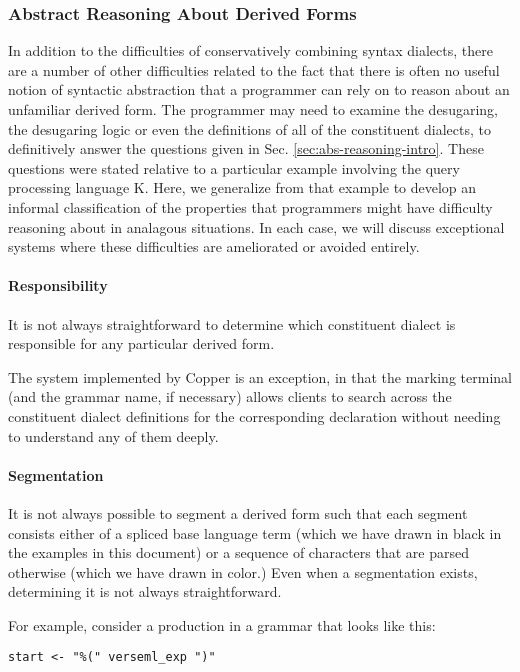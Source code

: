 {\subsubsection{Abstract Reasoning About Derived Forms}
In addition to the difficulties of conservatively combining syntax dialects, there are a  number of other difficulties related to the fact that there is often no useful notion of syntactic abstraction that a programmer can rely on to reason about an unfamiliar derived form. The programmer may need to examine the desugaring, the desugaring logic or even the definitions of all of the constituent dialects, to definitively answer the questions given in Sec. \ref{sec:abs-reasoning-intro}. These questions were stated relative to a particular example involving the query processing language K.  
Here, we generalize from that example to develop an informal classification of the properties that programmers might have difficulty reasoning about in analagous situations. In each case, we will discuss exceptional systems where these difficulties are ameliorated or avoided entirely.%

\paragraph{Responsibility} It is not always straightforward to determine which constituent dialect is responsible for any particular derived form.

The system implemented by Copper \cite{conf/pldi/SchwerdfegerW09} is an exception, in that the marking terminal (and the grammar name, if necessary) allows clients to search across the constituent dialect definitions for the corresponding declaration without needing to understand any of them deeply.

\paragraph{Segmentation} It is not always possible to segment a derived form such that each segment consists either of a spliced base language term (which we have drawn in black in the examples in this document) or a sequence of characters that are parsed otherwise (which we have drawn in color.) Even when a segmentation exists, determining it is not always straightforward.

For example, consider a production in a grammar that looks like this: 
\begin{lstlisting}[numbers=none]
start <- "%(" verseml_exp ")"
\end{lstlisting}

}
